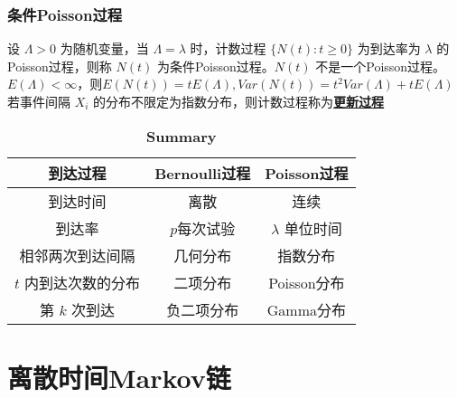 \documentclass[./main.tex]{subfiles}
\begin{document}
\subsubsection{条件Poisson过程}
设 $\Lambda>0$ 为随机变量，当 $\Lambda=\lambda$ 时，计数过程 $\{N(t):t\ge 0\}$ 为到达率为 $\lambda$ 的Poisson过程，则称 $N(t)$ 为条件Poisson过程。$N(t)$ 不是一个Poisson过程。\\
$E(\Lambda)<\infty$，则$E(N(t))=tE(\Lambda),Var(N(t))=t^2Var(\Lambda)+tE(\Lambda)$\\
若事件间隔 $X_i$ 的分布不限定为指数分布，则计数过程称为\underline{\textbf{更新过程}}

\begin{table}[h]
    \centering
    \caption{\textbf{Summary}}
    \begin{tabular}{ccc}
        \toprule
        到达过程             & Bernoulli过程 & Poisson过程        \\
        \hline
        到达时间             & 离散          & 连续               \\
        \hline
        到达率               & $p$每次试验   & $\lambda$ 单位时间 \\
        \hline
        相邻两次到达间隔     & 几何分布      & 指数分布           \\
        \hline
        $t$ 内到达次数的分布 & 二项分布      & Poisson分布        \\
        \hline
        第 $k$ 次到达        & 负二项分布    & Gamma分布          \\
        \bottomrule
    \end{tabular}
\end{table}
\section{离散时间Markov链}
\end{document}
